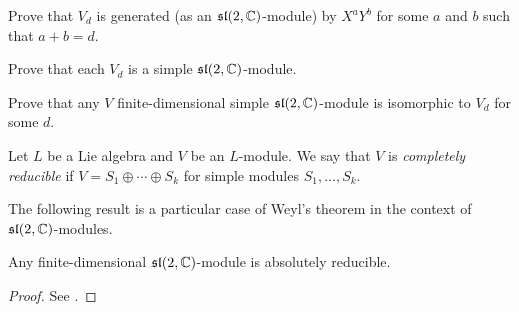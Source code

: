 \begin{exercise}
    Prove that $V_d$ is generated (as an $\mathfrak{sl}(2,\mathbb{C})$-module) by
    $X^aY^b$ for some $a$ and $b$ such that $a+b=d$. 
\end{exercise}

\begin{exercise}
    Prove that each $V_d$ is a simple $\mathfrak{sl}(2,\mathbb{C})$-module.
\end{exercise}

\begin{exercise}
    Prove that any $V$ finite-dimensional simple 
    $\mathfrak{sl}(2,\mathbb{C})$-module is isomorphic to $V_d$ for some $d$. 
\end{exercise}

\begin{definition}
    Let $L$ be a Lie algebra and $V$ be an $L$-module. We say that
    $V$ is \emph{completely reducible} if $V=S_1\oplus\cdots\oplus S_k$
    for simple modules $S_1,\dots,S_k$. 
\end{definition}

The following result is a particular
case of Weyl's theorem in the context of $\mathfrak{sl}(2,\mathbb{C})$-modules. 

\begin{theorem}
    Any finite-dimensional $\mathfrak{sl}(2,\mathbb{C})$-module is absolutely reducible. 
\end{theorem}

\begin{proof}
    See \cite[Exercises 8.6 and 9.15]{MR2218355}.
\end{proof}

    
    
    
